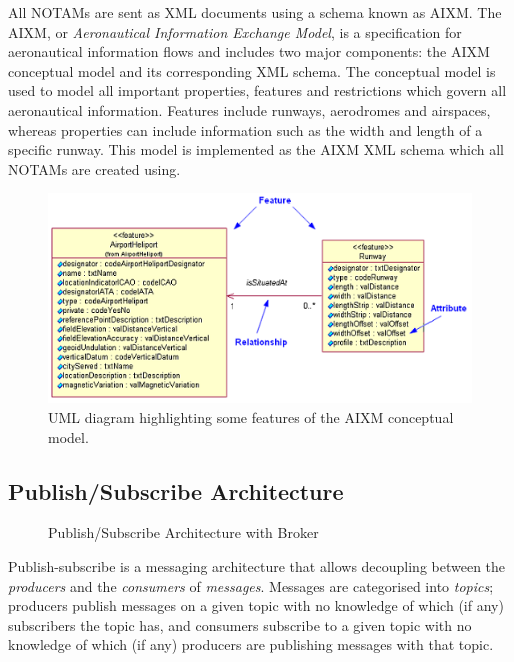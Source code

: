 \documentclass[a4paper, 12pt]{article}
\begin{document}
All NOTAMs are sent as XML documents using a schema known as AIXM. The AIXM, or \emph{Aeronautical Information Exchange Model}, is a specification for aeronautical information flows and includes two major components: the AIXM conceptual model and its corresponding XML schema. The conceptual model is used to model all important properties, features and restrictions which govern all aeronautical information. Features include runways, aerodromes and airspaces, whereas properties can include information such as the width and length of a specific runway. This model is implemented as the AIXM XML schema which all NOTAMs are created using.

\begin{figure}
\begin{center}
\def\svgwidth{\columnwidth}
\includegraphics[scale=0.5]{aixmUML.png}
\end{center}
\caption{UML diagram highlighting some features of the AIXM conceptual model.\cite{aixm}}
\label{fig:aixm}
\end{figure}

\newpage

\subsection{Publish/Subscribe Architecture}

\begin{figure}
\begin{center}
\def\svgwidth{\columnwidth}

\end{center}
\caption{Publish/Subscribe Architecture with Broker}
\label{fig:pubsub}
\end{figure}

Publish-subscribe is a messaging architecture that allows decoupling between the \emph{producers} and the \emph{consumers} of \emph{messages}. Messages are categorised into \emph{topics}; producers publish messages on a given topic with no knowledge of which (if any) subscribers the topic has, and consumers subscribe to a given topic with no knowledge of which (if any) producers are publishing messages with that topic.
\end{document}

